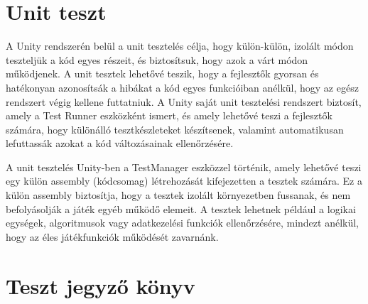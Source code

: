 \documentclass[
]{thesis-ekf}
\theoremstyle{definition}
\theoremstyle{remark}
\begin{document}
\section{Unit teszt}
A Unity rendszerén belül a unit tesztelés célja, hogy külön-külön, izolált módon teszteljük a kód egyes részeit, és biztosítsuk, hogy azok a várt módon működjenek. A unit tesztek lehetővé teszik, hogy a fejlesztők gyorsan és hatékonyan azonosítsák a hibákat a kód egyes funkcióiban anélkül, hogy az egész rendszert végig kellene futtatniuk. A Unity saját unit tesztelési rendszert biztosít, amely a Test Runner eszközként ismert, és amely lehetővé teszi a fejlesztők számára, hogy különálló tesztkészleteket készítsenek, valamint automatikusan lefuttassák azokat a kód változásainak ellenőrzésére.

A unit tesztelés Unity-ben a TestManager eszközzel történik, amely lehetővé teszi egy külön assembly (kódcsomag) létrehozását kifejezetten a tesztek számára. Ez a külön assembly biztosítja, hogy a tesztek izolált környezetben fussanak, és nem befolyásolják a játék egyéb működő elemeit. A tesztek lehetnek például a logikai egységek, algoritmusok vagy adatkezelési funkciók ellenőrzésére, mindezt anélkül, hogy az éles játékfunkciók működését zavarnánk.\cite{UnityTestRunner}

\section{Teszt jegyző könyv}
\end{document}
